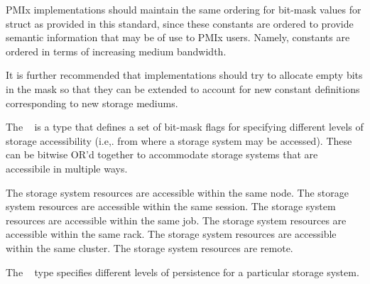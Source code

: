 \adviceimplstart
PMIx implementations should maintain the same ordering for bit-mask values for  struct as provided in this standard, since these constants are ordered to provide semantic information that may be of use to PMIx users. Namely,  constants are ordered in terms of increasing medium bandwidth.

It is further recommended that implementations should try to allocate empty bits in the mask so that they can be extended to account for new constant definitions corresponding to new storage mediums.
\adviceimplend


The ~\provisionalMarker{} is a  type that defines a set of bit-mask flags for specifying different levels of storage accessibility (i.e,. from where a storage system may be accessed). These can be bitwise OR'd together to accommodate storage systems that are accessibile in multiple ways.

\begin{constantdesc}
%
The storage system resources are accessible within the same node.
%
The storage system resources are accessible within the same session.
%
The storage system resources are accessible within the same job.
%
The storage system resources are accessible within the same rack.
%
The storage system resources are accessible within the same cluster.
%
The storage system resources are remote.
%
\end{constantdesc}


The ~\provisionalMarker{} type specifies different levels of persistence for a particular storage system.

